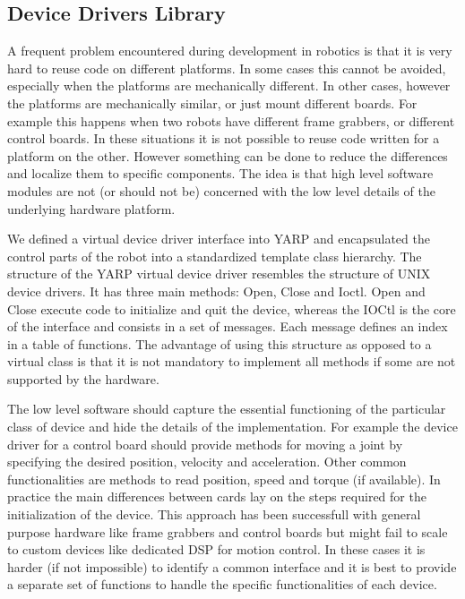 \subsection{Device Drivers Library}

A frequent problem encountered during development in robotics is that
it is very hard to reuse code on different platforms. In some cases
this cannot be avoided, especially when the platforms are mechanically
different. In other cases, however the platforms are mechanically
similar, or just mount different boards. For example this happens when
two robots have different frame grabbers, or different control
boards. In these situations it is not possible to reuse code written
for a platform on the other. However something can be done to reduce
the differences and localize them to specific components. The idea is
that high level software modules are not (or should not be) concerned
with the low level details of the underlying hardware platform.

We defined a virtual device driver interface into YARP and
encapsulated the control parts of the robot into a standardized
template class hierarchy. The structure of the YARP virtual device
driver resembles the structure of UNIX device drivers. It has three
main methods: Open, Close and Ioctl. Open and Close execute code to
initialize and quit the device, whereas the IOCtl is the core of the
interface and consists in a set of messages. Each message defines an
index in a table of functions. The advantage of using this structure
as opposed to a virtual class is that it is not mandatory to implement
all methods if some are not supported by the hardware.

The low level software should capture the essential functioning of the
particular class of device and hide the details of the
implementation. For example the device driver for a control board
should provide methods for moving a joint by specifying the desired
position, velocity and acceleration. Other common functionalities are
methods to read position, speed and torque (if available). In practice
the main differences between cards lay on the steps required for the
initialization of the device. This approach has been successfull with
general purpose hardware like frame grabbers and control boards but
might fail to scale to custom devices like dedicated DSP for motion
control. In these cases it is harder (if not impossible) to identify a
common interface and it is best to provide a separate set of functions
to handle the specific functionalities of each device.

